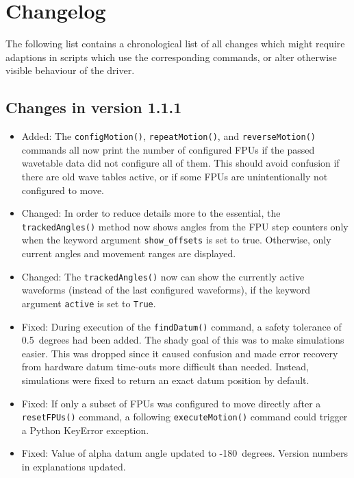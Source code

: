 \documentclass[11pt,a4paper]{scrartcl}
\begin{document}
\section{Changelog}
\label{sec:changelog}

The following list contains a chronological list of all changes which
might require adaptions in scripts which use the corresponding
commands, or alter otherwise visible behaviour of the driver.

\subsection*{Changes in version 1.1.1}
\begin{itemize}
\item Added: The \texttt{configMotion()}, \texttt{repeatMotion()}, and
  \texttt{reverseMotion()} commands all now print the number of
  configured FPUs if the passed wavetable data did not configure all
  of them. This should avoid confusion if there are old wave tables
  active, or if some FPUs are unintentionally not configured to move.

\item Changed: In order to reduce details more to the essential, the
  \texttt{trackedAngles()} method now shows angles from the FPU step
  counters only when the keyword argument \texttt{show\_offsets} is
  set to true. Otherwise, only current angles and movement ranges are
  displayed.

\item Changed: The \texttt{trackedAngles()} now can show the currently
  active waveforms (instead of the last configured waveforms), if the
  keyword argument \texttt{active} is set to \texttt{True}.
  
\item Fixed: During execution of the \texttt{findDatum()} command, a
  safety tolerance of 0.5\degree\ degrees had been added. The shady goal of
  this was to make simulations easier. This was dropped since it
  caused confusion and made error recovery from hardware datum
  time-outs more difficult than needed. Instead, simulations were
  fixed to return an exact datum position by default.
  
\item Fixed: If only a subset of FPUs was configured to move directly
  after a \texttt{resetFPUs()} command, a following
  \texttt{executeMotion()} command could trigger a Python KeyError
  exception.
  
\item Fixed: Value of alpha datum angle updated to
  -180\degree\ degrees. Version numbers in explanations updated.


\end{itemize}
\end{document}
